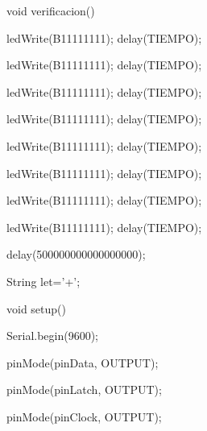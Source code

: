 \documentclass{article}
\begin{document}
void verificacion(){
  

   ledWrite(B11111111); delay(TIEMPO);

   ledWrite(B11111111); delay(TIEMPO);

   ledWrite(B11111111); delay(TIEMPO);

   ledWrite(B11111111); delay(TIEMPO);

   ledWrite(B11111111); delay(TIEMPO);

   ledWrite(B11111111); delay(TIEMPO);

   ledWrite(B11111111); delay(TIEMPO);

   ledWrite(B11111111); delay(TIEMPO);

  delay(500000000000000000);}

String let='+';

void setup(){

   Serial.begin(9600);

   pinMode(pinData, OUTPUT);

   pinMode(pinLatch, OUTPUT);

   pinMode(pinClock, OUTPUT);}
\end{document}
